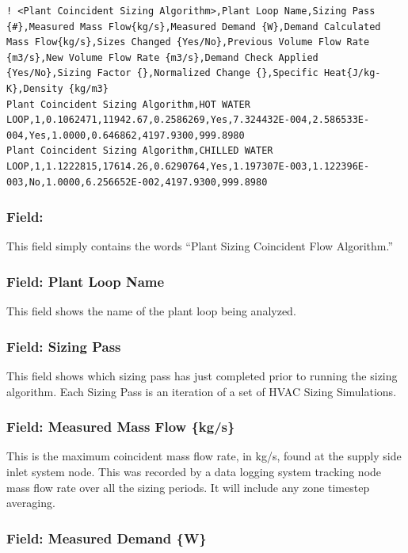 \begin{lstlisting}
! <Plant Coincident Sizing Algorithm>,Plant Loop Name,Sizing Pass {#},Measured Mass Flow{kg/s},Measured Demand {W},Demand Calculated Mass Flow{kg/s},Sizes Changed {Yes/No},Previous Volume Flow Rate {m3/s},New Volume Flow Rate {m3/s},Demand Check Applied {Yes/No},Sizing Factor {},Normalized Change {},Specific Heat{J/kg-K},Density {kg/m3}
Plant Coincident Sizing Algorithm,HOT WATER LOOP,1,0.1062471,11942.67,0.2586269,Yes,7.324432E-004,2.586533E-004,Yes,1.0000,0.646862,4197.9300,999.8980
Plant Coincident Sizing Algorithm,CHILLED WATER LOOP,1,1.1222815,17614.26,0.6290764,Yes,1.197307E-003,1.122396E-003,No,1.0000,6.256652E-002,4197.9300,999.8980
\end{lstlisting}

\subsubsection{Field: }\label{field}

This field simply contains the words ``Plant Sizing Coincident Flow Algorithm.''

\subsubsection{Field: Plant Loop Name}\label{field-plant-loop-name}

This field shows the name of the plant loop being analyzed.

\subsubsection{Field: Sizing Pass}\label{field-sizing-pass}

This field shows which sizing pass has just completed prior to running the sizing algorithm. Each Sizing Pass is an iteration of a set of HVAC Sizing Simulations.

\subsubsection{Field: Measured Mass Flow \{kg/s\}}\label{field-measured-mass-flow-kgs}

This is the maximum coincident mass flow rate, in kg/s, found at the supply side inlet system node. This was recorded by a data logging system tracking node mass flow rate over all the sizing periods. It will include any zone timestep averaging.

\subsubsection{Field: Measured Demand \{W\}}\label{field-measured-demand-w}

